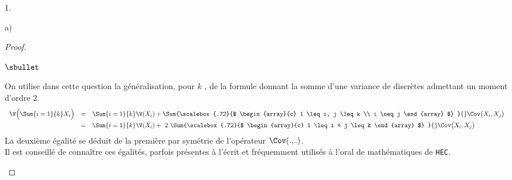 \begin{noliste}{1.}
\begin{noliste}{a)}
\begin{proof}
\begin{remarkL}{.98}
\begin{noliste}{$\sbullet$}
        \item On utilise dans cette question la généralisation, pour
          $k$ \var, de la formule donnant la somme d'une variance de
          \var discrètes admettant un moment d'ordre $2$.
          \[
          \begin{array}{rcl}
            \V \Big(\Sum{i=1}{k} X_i \Big) & = & \Sum{i=1}{k} \V(X_i) +
            \Sum{%
              \scalebox{.72}{$
                \begin{array}{c}
                  1 \leq i, j \leq k \\
                  i \neq j
                \end{array}
                $}
            }{} \Cov\big(X_i, X_j \big)
            \\[.2cm]
            & = & \Sum{i=1}{k} \V(X_i) + \ 2 \ 
            \Sum{%
              \scalebox{.72}{$
                \begin{array}{c}
                  1 \leq i < j \leq k %
                \end{array}
                $}
            }{} \Cov\big(X_i, X_j \big)
          \end{array}
          \]
          La deuxième égalité se déduit de la première par symétrie de
          l'opérateur $\Cov(., .)$.\\
          Il est conseillé de connaître ces égalités, parfois
          présentes à l'écrit et fréquemment utilisés à l'oral de
          mathématiques de {\tt HEC}.

\end{noliste}
\end{remarkL}
\end{proof}
\end{noliste}
\end{noliste}
